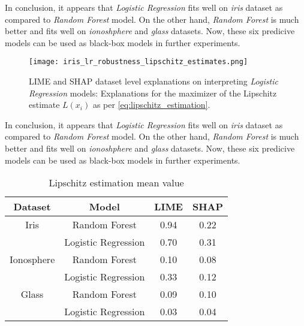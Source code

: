 \documentclass[english]{tktltiki2}
\theoremstyle{definition}
\theoremstyle{remark}
\begin{document}
In conclusion, it appears that \textit{Logistic Regression} fits well on \textit{iris} dataset as compared to \textit{Random Forest} model. On the other hand, \textit{Random Forest} is much better and fits well on \textit{ionoshphere} and \textit{glass} datasets. Now, these six predicive models can be used as black-box models in further experiments.

\begin{figure}[H]
	\centering
	\texttt{[image: iris\_lr\_robustness\_lipschitz\_estimates.png]}
	\vspace*{-10mm}
	\caption{LIME and SHAP dataset level explanations on interpreting \textit{Logistic Regression} models: Explanations for the maximizer of the Lipschitz estimate $L(x_i)$ as per \eqref{eq:lipschitz_estimation}.}
	\label{fig:iris_lr_robustness_lipschitz_estimates}
\end{figure} 

In conclusion, it appears that \textit{Logistic Regression} fits well on \textit{iris} dataset as compared to \textit{Random Forest} model. On the other hand, \textit{Random Forest} is much better and fits well on \textit{ionoshphere} and \textit{glass} datasets. Now, these six predicive models can be used as black-box models in further experiments.

\begin{table}[H]
	\caption{Lipschitz estimation mean value}
	\label{table:lipschitz_estimation_aggregated_datasets_UCI}
	\begin{center}
		\begin{tabular}{|c|c|c|c|}
			\hline
			\textbf{Dataset} & \textbf{Model} & \textbf{LIME} & \textbf{SHAP} \\ \hline
			
			Iris & Random Forest & 0.94 & 0.22  \\ \hline
			& Logistic Regression & 0.70 & 0.31 \\ \hline
			
			Ionosphere & Random Forest & 0.10 & 0.08 \\ \hline
			& Logistic Regression & 0.33 & 0.12 \\ \hline
			
			Glass & Random Forest & 0.09 & 0.10 \\ \hline
			& Logistic Regression & 0.03 & 0.04 \\ \hline
			
		\end{tabular}
	\end{center}
\end{table}
\end{document}
